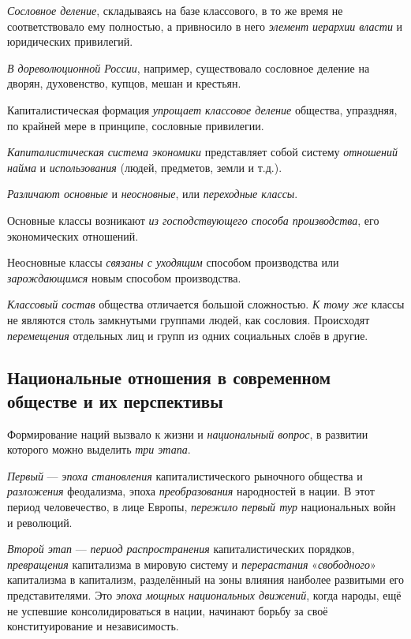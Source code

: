 \documentclass[a4paper,14pt,russian]{extreport}
\begin{document}
\emph{Сословное деление}, складываясь на базе классового, в то же время не соответствовало ему полностью, а привносило в него \emph{элемент иерархии власти} и юридических привилегий.

\emph{В дореволюционной России}, например, существовало сословное деление на дворян, духовенство, купцов, мешан и крестьян.

Капиталистическая формация \emph{упрощает классовое деление} общества, упраздняя, по крайней мере в принципе, сословные привилегии.

\emph{Капиталистическая система экономики} представляет собой систему \emph{отношений найма} и \emph{использования} (людей, предметов, земли и т.д.).

\emph{Различают основные} и \emph{неосновные}, или \emph{переходные классы}.

Основные классы возникают \emph{из господствующего способа производства}, его экономических отношений.

Неосновные классы \emph{связаны с уходящим} способом производства или \emph{зарождающимся} новым способом производства.

\emph{Классовый состав} общества отличается большой сложностью. \emph{К тому же} классы не являются столь замкнутыми группами людей, как сословия. Происходят \emph{перемещения} отдельных лиц и групп из одних социальных слоёв в другие.

\subsection{Национальные отношения в современном обществе и их перспективы}

Формирование наций вызвало к жизни и \emph{национальный вопрос}, в развитии которого можно выделить \emph{три этапа}.

\emph{Первый} --- \emph{эпоха становления} капиталистического рыночного общества и \emph{разложения} феодализма, эпоха \emph{преобразования} народностей в нации. В этот период человечество, в лице Европы, \emph{пережило первый тур} национальных войн и революций.

\emph{Второй этап} --- \emph{период распространения} капиталистических порядков, \emph{превращения} капитализма в мировую систему и \emph{перерастания} «\emph{свободного}» капитализма в капитализм, разделённый на зоны влияния наиболее развитыми его представителями. Это \emph{эпоха мощных национальных движений}, когда народы, ещё не успевшие консолидироваться в нации, начинают борьбу за своё конституирование и независимость.
\end{document}
